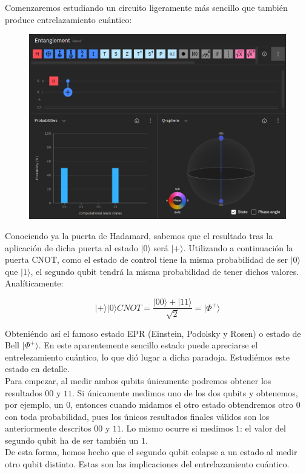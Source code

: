 \documentclass[11pt]{article}
\newcommand{\ra}{\rangle}
\begin{document}
Comenzaremos estudiando un circuito ligeramente más sencillo que también produce entrelazamiento cuántico:

\begin{figure}[H]
	\centering
	\includegraphics[scale=0.6]{figures/entanglement.png}
\end{figure}

Conociendo ya la puerta de Hadamard, sabemos que el resultado tras la aplicación de dicha puerta al estado $|0\ra$ será $|+\ra$. Utilizando a continuación la puerta CNOT, como el estado de control tiene la misma probabilidad de ser $|0\ra$ que $|1\ra$, el segundo qubit tendrá la misma probabilidad de tener dichos valores. Analíticamente:

\[
	|+\ra|0\ra CNOT = \frac{|00\ra + |11\ra}{\sqrt 2} = |\Phi^+\ra
\]

Obteniéndo así el famoso estado EPR (Einstein, Podolsky y Rosen) o estado de Bell $|\Phi^+\ra$. En este aparentemente sencillo estado puede apreciarse el entrelezamiento cuántico, lo que dió lugar a dicha paradoja. Estudiémos este estado en detalle. \\

Para empezar, al medir ambos qubits únicamente podremos obtener los resultados $00$ y $11$. Si únicamente medimos uno de los dos qubits y obtenemos, por ejemplo, un $0$, entonces cuando midamos el otro estado obtendremos otro $0$ con toda probabilidad, pues los únicos resultados finales válidos son los anteriormente descritos $00$ y $11$. Lo mismo ocurre si medimos $1$: el valor del segundo qubit ha de ser también un $1$. \\

De esta forma, hemos hecho que el segundo qubit colapse a un estado al medir otro qubit distinto. Estas son las implicaciones del entrelazamiento cuántico. \\
\end{document}
